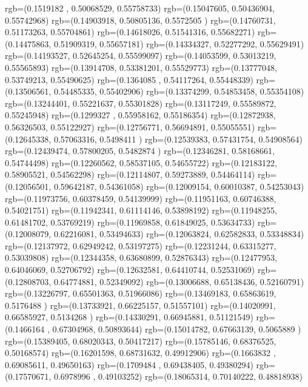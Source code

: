 {{{		  rgb=(0.1519182 ,  0.50068529,  0.55758733)
		  rgb=(0.15047605,  0.50436904,  0.55742968)
		  rgb=(0.14903918,  0.50805136,  0.5572505 )
		  rgb=(0.14760731,  0.51173263,  0.55704861)
		  rgb=(0.14618026,  0.51541316,  0.55682271)
		  rgb=(0.14475863,  0.51909319,  0.55657181)
		  rgb=(0.14334327,  0.52277292,  0.55629491)
		  rgb=(0.14193527,  0.52645254,  0.55599097)
		  rgb=(0.14053599,  0.53013219,  0.55565893)
		  rgb=(0.13914708,  0.53381201,  0.55529773)
		  rgb=(0.13777048,  0.53749213,  0.55490625)
		  rgb=(0.1364085 ,  0.54117264,  0.55448339)
		  rgb=(0.13506561,  0.54485335,  0.55402906)
		  rgb=(0.13374299,  0.54853458,  0.55354108)
		  rgb=(0.13244401,  0.55221637,  0.55301828)
		  rgb=(0.13117249,  0.55589872,  0.55245948)
		  rgb=(0.1299327 ,  0.55958162,  0.55186354)
		  rgb=(0.12872938,  0.56326503,  0.55122927)
		  rgb=(0.12756771,  0.56694891,  0.55055551)
		  rgb=(0.12645338,  0.57063316,  0.5498411 )
		  rgb=(0.12539383,  0.57431754,  0.54908564)
		  rgb=(0.12439474,  0.57800205,  0.5482874 )
		  rgb=(0.12346281,  0.58168661,  0.54744498)
		  rgb=(0.12260562,  0.58537105,  0.54655722)
		  rgb=(0.12183122,  0.58905521,  0.54562298)
		  rgb=(0.12114807,  0.59273889,  0.54464114)
		  rgb=(0.12056501,  0.59642187,  0.54361058)
		  rgb=(0.12009154,  0.60010387,  0.54253043)
		  rgb=(0.11973756,  0.60378459,  0.54139999)
		  rgb=(0.11951163,  0.60746388,  0.54021751)
		  rgb=(0.11942341,  0.61114146,  0.53898192)
		  rgb=(0.11948255,  0.61481702,  0.53769219)
		  rgb=(0.11969858,  0.61849025,  0.53634733)
		  rgb=(0.12008079,  0.62216081,  0.53494633)
		  rgb=(0.12063824,  0.62582833,  0.53348834)
		  rgb=(0.12137972,  0.62949242,  0.53197275)
		  rgb=(0.12231244,  0.63315277,  0.53039808)
		  rgb=(0.12344358,  0.63680899,  0.52876343)
		  rgb=(0.12477953,  0.64046069,  0.52706792)
		  rgb=(0.12632581,  0.64410744,  0.52531069)
		  rgb=(0.12808703,  0.64774881,  0.52349092)
		  rgb=(0.13006688,  0.65138436,  0.52160791)
		  rgb=(0.13226797,  0.65501363,  0.51966086)
		  rgb=(0.13469183,  0.65863619,  0.5176488 )
		  rgb=(0.13733921,  0.66225157,  0.51557101)
		  rgb=(0.14020991,  0.66585927,  0.5134268 )
		  rgb=(0.14330291,  0.66945881,  0.51121549)
		  rgb=(0.1466164 ,  0.67304968,  0.50893644)
		  rgb=(0.15014782,  0.67663139,  0.5065889 )
		  rgb=(0.15389405,  0.68020343,  0.50417217)
		  rgb=(0.15785146,  0.68376525,  0.50168574)
		  rgb=(0.16201598,  0.68731632,  0.49912906)
		  rgb=(0.1663832 ,  0.69085611,  0.49650163)
		  rgb=(0.1709484 ,  0.69438405,  0.49380294)
		  rgb=(0.17570671,  0.6978996 ,  0.49103252)
		  rgb=(0.18065314,  0.70140222,  0.48818938)
}}}
